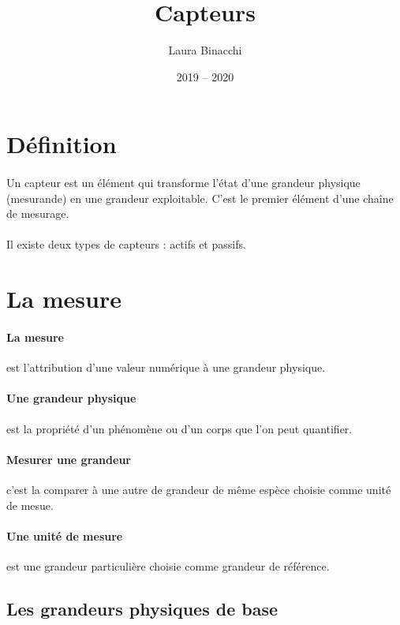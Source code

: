 \documentclass{article}
\title{Capteurs}
\date{2019 -- 2020}
\author{Laura Binacchi}
\begin{document}
\maketitle
\newpage
\tableofcontents
{}
\newpage
    \section{Définition}
        \paragraph{}
        Un capteur est un élément qui transforme l'état d'une grandeur physique (mesurande) en une grandeur exploitable. C'est le premier élément d'une chaîne de mesurage.

        \paragraph{}
        Il existe deux types de capteurs : actifs et passifs.

    \section{La mesure}
        \paragraph{La mesure} est l'attribution d'une valeur numérique à une grandeur physique.

        \paragraph{Une grandeur physique} est la propriété d'un phénomène ou d'un corps que l'on peut quantifier.

        \paragraph{Mesurer une grandeur} c'est la comparer à une autre de grandeur de même espèce choisie comme unité de mesue.

        \paragraph{Une unité de mesure} est une grandeur particulière choisie comme grandeur de référence.

        \subsection{Les grandeurs physiques de base}
\end{document}
